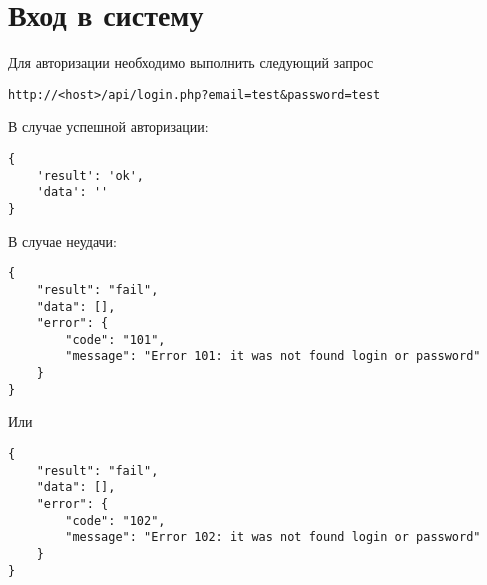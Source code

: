 \section{Вход в систему}
\par
Для авторизации необходимо выполнить следующий запрос \\

\begin{Verbatim}[frame=single]
http://<host>/api/login.php?email=test&password=test
\end{Verbatim}

В случае успешной авторизации:  \\
\begin{Verbatim}[frame=single]
{
    'result': 'ok',
    'data': ''
}
\end{Verbatim}

В случае неудачи:

\begin{Verbatim}[frame=single]
{
    "result": "fail",
    "data": [],
    "error": {
        "code": "101",
        "message": "Error 101: it was not found login or password"
    }
}
\end{Verbatim}

Или

\begin{Verbatim}[frame=single]
{
    "result": "fail",
    "data": [],
    "error": {
        "code": "102",
        "message": "Error 102: it was not found login or password"
    }
}
\end{Verbatim}

